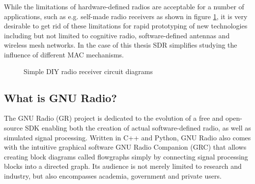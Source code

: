 While the limitations of hardware-defined radios are acceptable for a number of applications, such as e.g. self-made radio receivers as shown in figure \ref{fig:radio-receiver-circuits}, it is very desirable to get rid of these limitations for rapid prototyping of new technologies including but not limited to cognitive radio, software-defined antennas and wireless mesh networks. In the case of this thesis SDR simplifies studying the influence of different MAC mechanisms.

\begin{figure}[t]
	\label{fig:radio-receiver-circuits}
	\begin{center}
		\qquad
	\end{center}
	\caption{Simple DIY radio receiver circuit diagrams}
\end{figure}

\subsection{What is GNU Radio?}

\label{sec:gnu-radio}

The GNU Radio (GR) project is dedicated to the evolution of a free and open-source SDK enabling both the creation of actual software-defined radio, as well as simulated signal processing. Written in C++ and Python, GNU Radio also comes with the intuitive graphical software GNU Radio Companion (GRC) that allows creating block diagrams called flowgraphs simply by connecting signal processing blocks into a directed graph. Its audience is not merely limited to research and industry, but also encompasses academia, government and private users.

